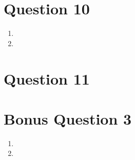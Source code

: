 \documentclass{article}
\begin{document}
\section{Question 10}

\begin{enumerate}[label=(\alph*)]

    \item 

    
    \item 


\end{enumerate}


\section{Question 11}

\section{Bonus Question 3}

\begin{enumerate}[label=(\alph*)]

    \item 

    
    \item 

\end{enumerate}


\end{document}
